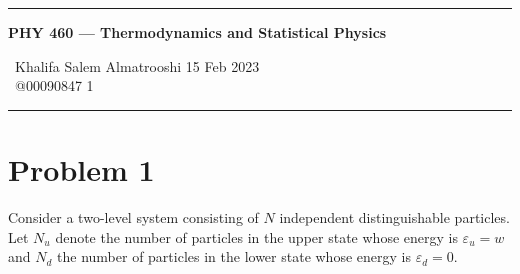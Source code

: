 \documentclass{article}
\begin{document}
	
	\begin{center}
		\hrule
		\vspace{0.4cm}
		\textbf { \large PHY 460 --- Thermodynamics and Statistical Physics}
		\vspace{0.4cm}
	\end{center}
		 \ Khalifa Salem Almatrooshi \hspace{\fill}  15 Feb 2023 \\
		 \ @00090847 \hspace{\fill}  1 \\
		\hrule	
	
	\section*{Problem 1}
	Consider a two-level system consisting of $N$ independent distinguishable particles. Let $N_u$ denote the number of particles in the upper state whose energy is $\varepsilon_u = w$ and $N_d$ the number of particles in the lower state whose energy is $\varepsilon_d = 0$.
\end{document}
